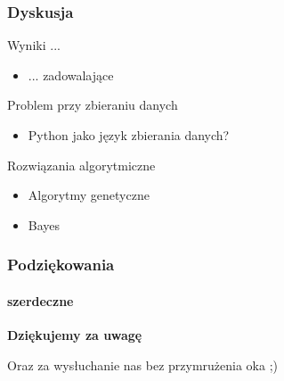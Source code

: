 \documentclass{beamer}
\begin{document}
\begin{frame}	
    \frametitle{Dyskusja}
    \pause
    \begin{block}{Wyniki ...}
        \pause
        \begin{itemize} [<+->]
            \item ... zadowalające\\
        \end{itemize}
    \end{block}
    \pause
    \begin{block}{Problem przy zbieraniu danych}
        \pause
        \begin{itemize} [<+->]
            \item Python jako język zbierania danych?\\
        \end{itemize}
    \end{block}
    \pause
    \begin{block}{Rozwiązania algorytmiczne}
        \pause
        \begin{itemize} [<+->]
            \item Algorytmy genetyczne\\
            \item Bayes\\
        \end{itemize}
    \end{block}
\end{frame}







\begin{frame}
\frametitle{Podziękowania}
\framesubtitle{szerdeczne}

\begin{center}
\textbf{Dziękujemy za uwagę}\\
\begin{tiny}
    Oraz za wysłuchanie nas bez przymrużenia oka ;)
\end{tiny}
\end{center}
\end{frame}
\end{document}
